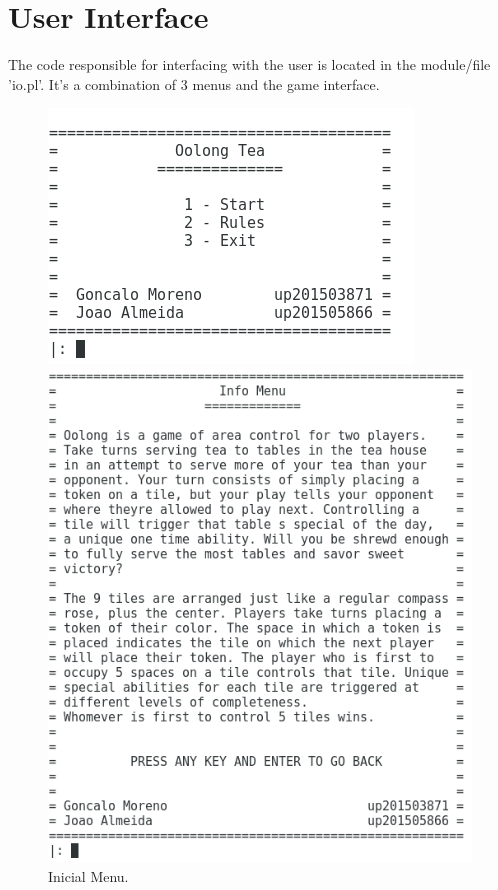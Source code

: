 \documentclass[a4paper]{article}
\begin{document}
\section{User Interface}

The code responsible for interfacing with the user is located in the module/file 'io.pl'.
It's a combination of 3 menus and the game interface.

\begin{figure}[H]
\centering
{}
  \includegraphics[width=\linewidth]{menu_inicial.png} \hspace{0.5cm}
  \caption{Inicial Menu.}\label{fig:menu_inicial}
\endminipage \hspace{2mm}
  \includegraphics[width=\linewidth]{menu_info.png} \hspace{0.5cm}

\end{figure}
\end{document}
